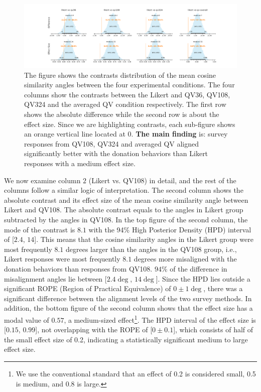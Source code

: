 \begin{figure}[htpb]
  \centering
  \includegraphics[trim= 2in 0in 2in 0in, clip, width=\textwidth, keepaspectratio=true]{"content/image/Votes_vs_Absolute_Donation_StudentT_differences_and_effects.pdf"}
  \caption{
    The figure shows the contrasts distribution of the mean cosine similarity angles between the four experimental conditions. The four columns show the contrasts between the Likert and QV36, QV108, QV324 and the averaged QV condition respectively. The first row shows the absolute difference while the second row is about the effect size. Since we are highlighting contrasts, each sub-figure shows an orange vertical line located at 0. \textbf{The main finding} is: survey responses from QV108, QV324 and averaged QV aligned significantly better with the donation behaviors than Likert responses with a medium effect size.
  }
  \label{fig:contrast_exp1}
\end{figure}

We now examine column $2$ (Likert vs. QV108) in detail, and the rest of the columns follow a similar logic of interpretation. The second column shows the absolute contrast and its effect size of the mean cosine similarity angle between Likert and QV108. The absolute contrast equals to the angles in Likert group subtracted by the angles in QV108. In the top figure of the second column, the mode of the contrast is $8.1$ with the 94\% High Posterior Density (HPD) interval of [$2.4$, $14$]. This means that the cosine similarity angles in the Likert group were most frequently $8.1$ degrees larger than the angles in the QV108 group, i.e., Likert responses were most frequently $8.1$ degrees more misaligned with the donation behaviors than responses from QV108. $94\%$ of the difference in misalignment angles lie between [$2.4 \deg$, $14 \deg$]. Since the HPD lies outside a significant ROPE (Region of Practical Equivalence) of $0 \pm 1 \deg$, there was a significant difference between the alignment levels of the two survey methods. In addition, the bottom figure of the second column shows that the effect size has a modal value of $0.57$, a medium-sized effect\footnote{We use the conventional standard that an effect of 0.2 is considered small, 0.5 is medium, and 0.8 is large.}. The HPD interval of the effect size is [$0.15$, $0.99$], not overlapping with the ROPE of [$0 \pm 0.1$], which consists of half of the small effect size of 0.2, indicating a statistically significant medium to large effect size.

